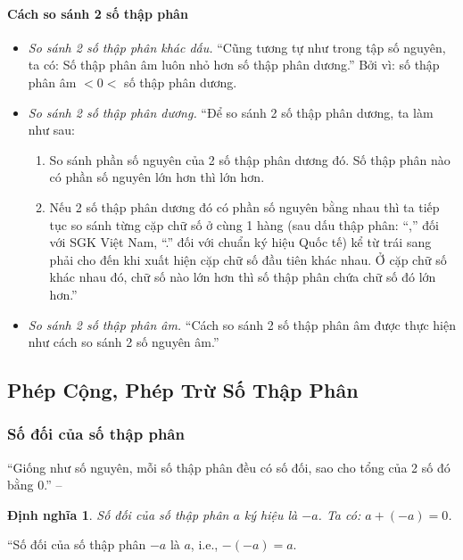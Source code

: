 \documentclass{article}
\numberwithin{equation}{section}
\newtheorem{dinhnghia}{Định nghĩa}[section]
\begin{document}
\paragraph{Cách so sánh 2 số thập phân}
\begin{itemize}
	\item \textit{So sánh 2 số thập phân khác dấu.} ``Cũng tương tự như trong tập số nguyên, ta có: Số thập phân âm luôn nhỏ hơn số thập phân dương.'' Bởi vì: số thập phân âm $< 0 <$ số thập phân dương.
	\item \textit{So sánh 2 số thập phân dương.} ``Để so sánh 2 số thập phân dương, ta làm như sau:
	\begin{enumerate}
		\item So sánh phần số nguyên của 2 số thập phân dương đó. Số thập phân nào có phần số nguyên lớn hơn thì lớn hơn.
		\item Nếu 2 số thập phân dương đó có phần số nguyên bằng nhau thì ta tiếp tục so sánh từng cặp chữ số ở cùng 1 hàng (sau dấu thập phân: ``,'' đối với SGK Việt Nam, ``.'' đối với chuẩn ký hiệu Quốc tế) kể từ trái sang phải cho đến khi xuất hiện cặp chữ số đầu tiên khác nhau. Ở cặp chữ số khác nhau đó, chữ số nào lớn hơn thì số thập phân chứa chữ số đó lớn hơn.'' 
	\end{enumerate}
	\item \textit{So sánh 2 số thập phân âm.} ``Cách so sánh 2 số thập phân âm được thực hiện như cách so sánh 2 số nguyên âm.'' 
\end{itemize}


\subsection{Phép Cộng, Phép Trừ Số Thập Phân}

\subsubsection{Số đối của số thập phân}
``Giống như số nguyên, mỗi số thập phân đều có số đối, sao cho tổng của 2 số đó bằng 0.'' -- \cite[p. 48]{SGK_Toan_6_Canh_Dieu_tap_2}

\begin{dinhnghia}
	\emph{Số đối} của số thập phân $a$ ký hiệu là $-a$. Ta có: $a + (-a) = 0$.
\end{dinhnghia}
``Số đối của số thập phân $-a$ là $a$, i.e., $-(-a) = a$.
\end{document}
